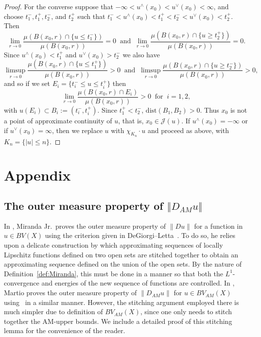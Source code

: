 \documentclass[11pt, letterpaper]{amsart} %
\numberwithin{equation}{section}
\theoremstyle{plain}
\theoremstyle{definition}
\begin{document}
{\begin{proof}
For the converse suppose that $-\infty<u^\wedge (x_0)<u^\vee (x_0)<\infty$, 
and choose $t_1^-, t_1^+, t_2^-$, and $t_2^+$ such that 
$t_1^-<u^\wedge (x_0) <t_1^+<t_2^-<u^\vee (x_0)<t_2^+$. Then 
\[ 
\lim_{r\to 0}\frac{\mu (B(x_0,r)\cap \{ u\leq t_1^-\})}{\mu (B(x_0,r))}=0 \ \text{ and }\
\lim_{r\to 0}\frac{\mu (B(x_0,r)\cap \{ u\geq t_2^+\})}{\mu (B(x_0,r))}=0.
\] 
Since $u^\wedge (x_0)<t_1^+$ and $u^\vee (x_0)>t_2^-$ we also have
\[ 
\limsup_{r\to 0}\frac{\mu (B(x_0,r)\cap \{ u\leq t_1^+\})}{\mu (B(x_0,r))}>0 \ \text{ and }\
\limsup_{r\to 0}\frac{\mu (B(x_0,r)\cap \{ u\geq t_2^-\})}{\mu (B(x_0,r))}>0,
\] 
and so if we set $E_i = \{ t_i^-\leq u\leq t_i^+\}$ then
\[
\lim_{r\to 0}\frac{\mu (B(x_0,r)\cap E_i)}{\mu (B(x_0,r))}>0\ \text{ for }\ i=1,2,
\]
with $u(E_i)\subset B_i:=(t_i^-,t_i^+)$. Since $t_1^+<t_2^-$, $\mathrm{dist} (B_1,B_2)>0$. Thus $x_0$ is not
a point of approximate continuity of $u$, that is, $x_0\in\mathcal{J}(u)$. If $u^\wedge(x_0)=-\infty$ or
if $u^\vee(x_0)=\infty$, then we replace $u$ with $\chi_{K_n}\cdot u$ and proceed as above, with 
$K_n=\{|u|\le n\}$.
\end{proof}



\section{Appendix}

\subsection{The outer measure property of $\Vert D_{AM}u\Vert$}\label{section:OuterMeasure}

In \cite[Theorem~3.4]{Miranda}, Miranda Jr.\ proves the outer measure property of $\|Du\|$ for a function in $u\in BV(X)$ 
using the criterion given in DeGiorgi--Letta~\cite[Theorem~5.1]{DL}.  To do so, he relies upon a delicate 
construction by which approximating sequences of locally Lipschitz functions defined on two open sets are stitched 
together to obtain an approximating sequence defined on the union of the open sets.  By the nature of 
Definition~\ref{def:Miranda}, this must be done in a manner so that both the $L^1$-convergence and 
energies of the new sequence of functions are controlled.  In \cite[Theorem~4.1]{Martio}, Martio 
proves the outer measure property of $\|D_{AM}u\|$ for $u\in BV_{AM}(X)$ using~\cite[Theorem~5.1]{DL} in 
a similar manner.  However, the stitching argument employed there is much simpler due to definition of 
$BV_{AM}(X)$, since one only needs to stitch together the AM-upper bounds.  We include a detailed 
proof of this stitching lemma for the convenience of the reader.       

}
\end{document}
